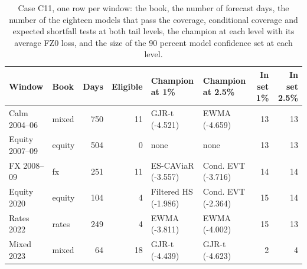 \begin{table}[htbp]
\centering
\footnotesize
\setlength{\tabcolsep}{3.0pt}
\caption{Case C11, one row per window: the book, the number of forecast days, the number of the eighteen models that pass the coverage, conditional coverage and expected shortfall tests at both tail levels, the champion at each level with its average FZ0 loss, and the size of the 90 percent model confidence set at each level.}
\label{tab:market-windows}
\begin{tabular}{llrrp{3.2cm}p{3.2cm}rr}
\toprule
Window & Book & Days & Eligible & Champion at 1\% & Champion at 2.5\% & In set 1\% & In set 2.5\% \\
\midrule
Calm 2004--06 & mixed & 750 & 11 & GJR-t (-4.521) & EWMA (-4.659) & 13 & 13 \\
Equity 2007--09 & equity & 504 & 0 & none & none & 13 & 13 \\
FX 2008--09 & fx & 251 & 11 & ES-CAViaR (-3.557) & Cond. EVT (-3.716) & 14 & 14 \\
Equity 2020 & equity & 104 & 4 & Filtered HS (-1.986) & Cond. EVT (-2.364) & 15 & 14 \\
Rates 2022 & rates & 249 & 4 & EWMA (-3.811) & EWMA (-4.002) & 15 & 13 \\
Mixed 2023 & mixed & 64 & 18 & GJR-t (-4.439) & GJR-t (-4.623) & 2 & 4 \\
\bottomrule
\end{tabular}
\end{table}
